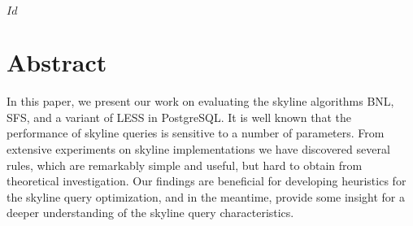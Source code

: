 
\svnInfo $Id$


\chapter*{Abstract\revision}

In this paper, we present our work on evaluating the skyline
algorithms BNL, SFS, and a variant of LESS in PostgreSQL. It is well
known that the performance of skyline queries is sensitive to a number
of parameters.  From extensive experiments on skyline implementations
we have discovered several rules, which are remarkably simple and
useful, but hard to obtain from theoretical investigation.  Our
findings are beneficial for developing heuristics for the skyline
query optimization, and in the meantime, provide some insight for a
deeper understanding of the skyline query characteristics.

\bigskip
\todo{}{}